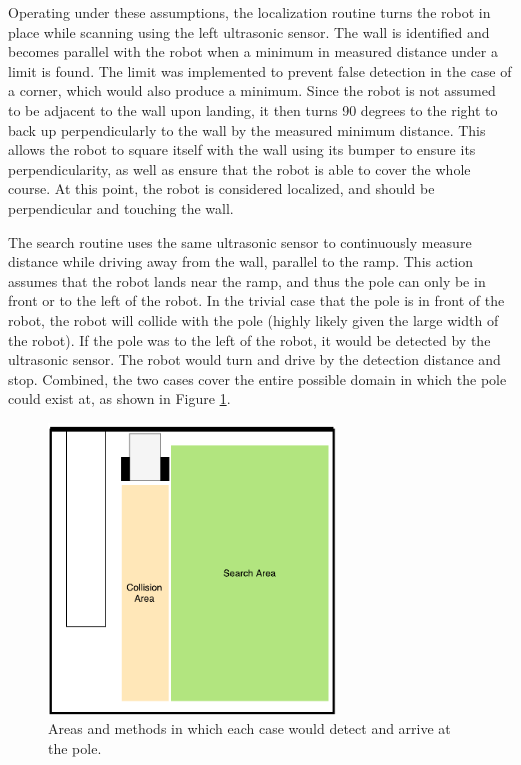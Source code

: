 \documentclass[ece]{uw-wkrpt}
\begin{document}
Operating under these assumptions, the localization routine turns the robot in place while scanning using the left ultrasonic sensor. The wall is identified and becomes parallel with the robot when a minimum in measured distance under a limit is found. The limit was implemented to prevent false detection in the case of a corner, which would also produce a minimum. Since the robot is not assumed to be adjacent to the wall upon landing, it then turns 90 degrees to the right to back up perpendicularly to the wall by the measured minimum distance. This allows the robot to square itself with the wall using its bumper to ensure its perpendicularity, as well as ensure that the robot is able to cover the whole course. At this point, the robot is considered localized, and should be perpendicular and touching the wall.  

The search routine uses the same ultrasonic sensor to continuously measure distance while driving away from the wall, parallel to the ramp. This action assumes that the robot lands near the ramp, and thus the pole can only be in front or to the left of the robot. In the trivial case that the pole is in front of the robot, the robot will collide with the pole (highly likely given the large width of the robot). If the pole was to the left of the robot, it would be detected by the ultrasonic sensor. The robot would turn and drive by the detection distance and stop. Combined, the two cases cover the entire possible domain in which the pole could exist at, as shown in Figure \ref{fig:SAAreas}. 

\begin{figure}
    \centering
    \includegraphics[width=3in]{res/SA-Areas}
    \caption[Areas and methods in which each case would detect and arrive at the pole]
          {Areas and methods in which each case would detect and arrive at the pole.}
    \label{fig:SAAreas}
\end{figure}
\end{document}

